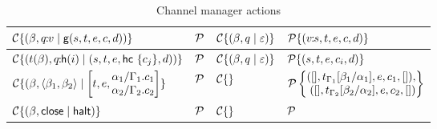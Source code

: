 \documentclass[11pt]{article}
\newcommand{\<}{\langle}
\renewcommand{\>}{\rangle}
\begin{document}
\begin{table}
\begin{center}
\begin{tabular}{|l|l||l|l|} \hline
${\cal C}\{ (\beta , q\!\!:\!\!v \mid {\sf g}(s,t,e,c,d)) \}$ & ${\cal P}$ & ${\cal C}\{ (\beta,q \mid \varepsilon) \}$ & ${\cal P}\{(v\!\!:\!\! s,t,e,c,d)\}$ \\ \hline
${\cal C}\{ (t(\beta) , q\!\!:\!\!{\sf h}(i)  \mid (s,t,e,{\sf hc} ~\{ c_j \},d)) \}$ & ${\cal P}$ & ${\cal C}\{ (\beta,q \mid \varepsilon) \}$ & ${\cal P}\{(s,t,e,c_i,d)\}$ \\ \hline
${\cal C}\{ (\beta, \<\beta_1,\beta_2\> \mid \left[t,e,\!\!\!\begin{array}[c]{l} \alpha_1/\Gamma_1. c_1 \\ \alpha_2/\Gamma_2. c_2 \end{array} \!\!\!\right] \} $ & ${\cal P}$ 
                     & ${\cal C}\{ \}$ & ${\cal P}\left\{ \!\!\!\begin{array}{r} ([],t_{\Gamma_1}[\beta_1/\alpha_1],e,c_1,[]), \\
                                              ([],t_{\Gamma_2}[\beta_2/\alpha_2],e,c_2,[]) \end{array} \!\!\!\right\}$ \\ \hline
${\cal C}\{ (\beta,{\sf close}\mid {\sf halt} ) \}$ & ${\cal P}$ & ${\cal C}\{ \}$ & ${\cal P}$ \\ \hline
\end{tabular}
\caption{Channel manager actions}
\label{channel-actions}
\end{center}
\end{table}
\end{document}

